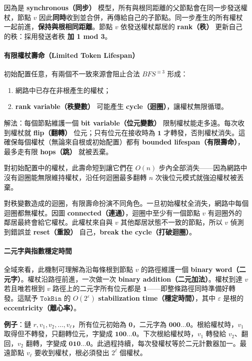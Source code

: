 \documentclass[a4paper, 12pt]{article}
\newcommand{\bz}{\mathbf{0}}
\newcommand{\bo}{\mathbf{1}}
\begin{document}
因為是 \textbf{synchronous（同步）} 模型，所有與根同距離的父節點會在同一步發送權杖，節點 \(v\) 因此\textbf{同時}收到並合併，再傳給自己的子節點。同一步產生的所有權杖一起前進，\textbf{保持與根相同距離}。節點 \(v\) 依發送權杖鄰居的 \textbf{rank（秩）} 更新自己的秩：採用發送者秩 \textbf{加 1 mod 3}。

\paragraph{有限權杖壽命（Limited Token Lifespan）}
初始配置任意，有兩個不一致來源會阻止合法 \(BFS^{\equiv 3}\) 形成：
\begin{enumerate}
    \item 網路中已存在非根產生的權杖；
    \item \textbf{rank variable（秩變數）} 可能產生 \textbf{cycle（迴圈）}，讓權杖無限循環。
\end{enumerate}

解法：每個節點維護一個 \textbf{bit variable（位元變數）} 限制權杖能走多遠。每次收到權杖就 \textbf{flip（翻轉）} 位元；只有位元在接收時為 \(\bo\) 才轉發，否則權杖消失。這確保每個權杖（無論來自根或初始配置）都有 \textbf{bounded lifespan（有限壽命）}，最多走有限 \textbf{hops（跳）} 就被丟棄。

對初始配置中的權杖，此壽命短到讓它們在 \(O(n)\) 步內全部消失——因為網路中沒有迴圈能無限維持權杖，沿任何迴圈最多翻轉 \(n\) 次後位元模式就強迫權杖被丟棄。

對秩變數造成的迴圈，有限壽命扮演不同角色。一旦初始權杖全消失，網路中每個迴圈都無權杖。因圖 \textbf{connected（連通）}，迴圈中至少有一個節點 \(v\) 有迴圈外的鄰居最終會給它權杖。此權杖來自與 \(v\) 其他鄰居狀態不一致的節點，所以 \(v\) 偵測到錯誤並 \textbf{reset（重設）} 自己，\textbf{break the cycle（打破迴圈）}。

\paragraph{二元字與指數穩定時間}
全域來看，此機制可理解為沿每條根到節點 \(v\) 的路徑維護一個 \textbf{binary word（二元字）}。權杖沿路徑前進，一次做一次 \textbf{binary addition（二元加法）}。權杖到達 \(v\) 若且唯若根到 \(v\) 路徑上的二元字所有位元都是 \(\bo\)——即整條路徑同時準備好轉發。這賦予 \(\mathtt{TokBin}\) 的 \(O(2^{\varepsilon})\) \textbf{stabilization time（穩定時間）}，其中 \(\varepsilon\) 是根的 \textbf{eccentricity（離心率）}。

\textbf{例子}：鏈 \(r,v_1,v_2,\dots,v_\ell\)，所有位元初始為 \(\bz\)，二元字為 \(\bz\bz\bz\dots\bz\)。根給權杖時，\(v_1\) 取得但不轉發，只翻轉位元，字變成 \(\bo\bz\bz\dots\bz\)。下次根給權杖時，\(v_1\) 轉發給 \(v_2\)、翻回，\(v_2\) 翻轉，字變成 \(\bz\bo\bz\dots\bz\)。此過程持續，每次發權杖等於二元計數器加一。最遠節點 \(v_\ell\) 要收到權杖，根必須發出 \(2^\ell\) 個權杖。
\end{document}
